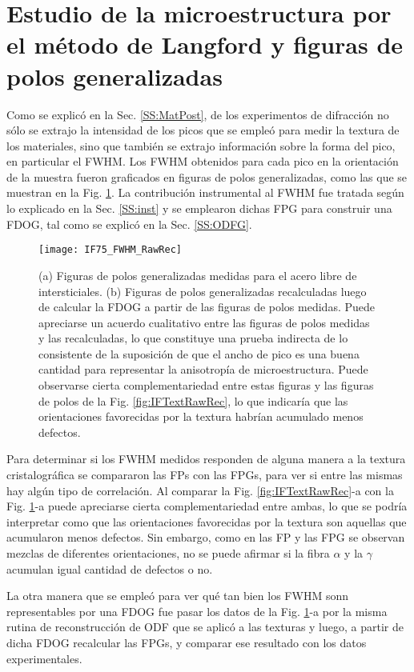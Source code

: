\section{Estudio de la microestructura por el método de Langford y figuras de polos generalizadas}\label{S:IFLANG}
Como se explicó en la Sec. \ref{SS:MatPost}, de los experimentos de difracción no sólo se extrajo la intensidad de los picos que se empleó para medir la textura de los materiales, sino que también se extrajo información sobre la forma del pico, en particular el FWHM.
Los FWHM obtenidos para cada pico en la orientación de la muestra fueron graficados en figuras de polos generalizadas, como las que se muestran en la Fig. \ref{fig:IFFWHMRawRec}.
La contribución instrumental al FWHM fue tratada según lo explicado en la Sec. \ref{SS:inst} y se emplearon dichas FPG para construir una FDOG, tal como se explicó en la Sec. \ref{SS:ODFG}.

\begin{figure}[!htb]
  \centering
  \texttt{[image: IF75\_FWHM\_RawRec]}
  \caption{(a) Figuras de polos generalizadas medidas para el acero libre de intersticiales. (b) Figuras de polos generalizadas recalculadas luego de calcular la FDOG a partir de las figuras de polos medidas. Puede apreciarse un acuerdo cualitativo entre las figuras de polos medidas y las recalculadas, lo que constituye una prueba indirecta de lo consistente de la suposición de que el ancho de pico es una buena cantidad para representar la anisotropía de microestructura. Puede observarse cierta complementariedad entre estas figuras y las figuras de polos de la Fig. \ref{fig:IFTextRawRec}, lo que indicaría que las orientaciones favorecidas por la textura habrían acumulado menos defectos.}
  \label{fig:IFFWHMRawRec}
\end{figure}

Para determinar si los FWHM medidos responden de alguna manera a la textura cristalográfica se compararon las FPs con las FPGs, para ver si entre las mismas hay algún tipo de correlación.
Al comparar la Fig. \ref{fig:IFTextRawRec}-a con la Fig. \ref{fig:IFFWHMRawRec}-a puede apreciarse cierta complementariedad entre ambas, lo que se podría interpretar como que las orientaciones favorecidas por la textura son aquellas que acumularon menos defectos.
Sin embargo, como en las FP y las FPG se observan mezclas de diferentes orientaciones, no se puede afirmar si la fibra $\alpha$ y la $\gamma$ acumulan igual cantidad de defectos o no.

La otra manera que se empleó para ver qué tan bien los FWHM sonn representables por una FDOG fue pasar los datos de la Fig. \ref{fig:IFFWHMRawRec}-a por la misma rutina de reconstrucción de ODF que se aplicó a las texturas y luego, a partir de dicha FDOG recalcular las FPGs, y comparar ese resultado con los datos experimentales.

